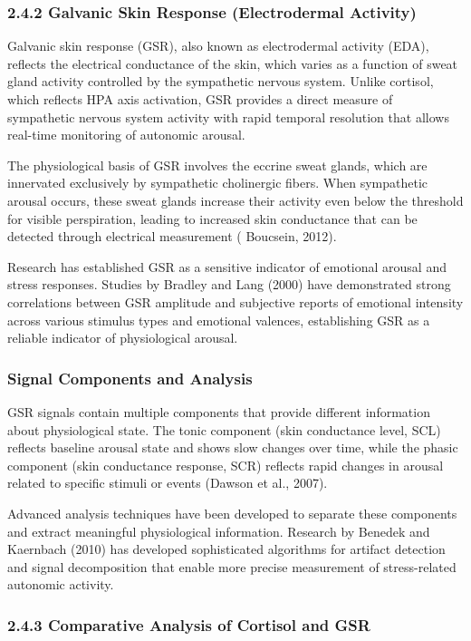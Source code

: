 \documentclass[12pt,a4paper]{article}
\begin{document}
\subsubsection{2.4.2 Galvanic Skin Response (Electrodermal Activity)}

Galvanic skin response (GSR), also known as electrodermal activity (EDA), reflects the electrical conductance of the
skin, which varies as a function of sweat gland activity controlled by the sympathetic nervous system. Unlike cortisol,
which reflects HPA axis activation, GSR provides a direct measure of sympathetic nervous system activity with rapid
temporal resolution that allows real-time monitoring of autonomic arousal.

The physiological basis of GSR involves the eccrine sweat glands, which are innervated exclusively by sympathetic
cholinergic fibers. When sympathetic arousal occurs, these sweat glands increase their activity even below the threshold
for visible perspiration, leading to increased skin conductance that can be detected through electrical measurement (
Boucsein, 2012).

Research has established GSR as a sensitive indicator of emotional arousal and stress responses. Studies by Bradley and
Lang (2000) have demonstrated strong correlations between GSR amplitude and subjective reports of emotional intensity
across various stimulus types and emotional valences, establishing GSR as a reliable indicator of physiological arousal.

\subsubsection{Signal Components and Analysis}

GSR signals contain multiple components that provide different information about physiological state. The tonic
component (skin conductance level, SCL) reflects baseline arousal state and shows slow changes over time, while the
phasic component (skin conductance response, SCR) reflects rapid changes in arousal related to specific stimuli or
events (Dawson et al., 2007).

Advanced analysis techniques have been developed to separate these components and extract meaningful physiological
information. Research by Benedek and Kaernbach (2010) has developed sophisticated algorithms for artifact detection and
signal decomposition that enable more precise measurement of stress-related autonomic activity.

\subsubsection{2.4.3 Comparative Analysis of Cortisol and GSR}
\end{document}
